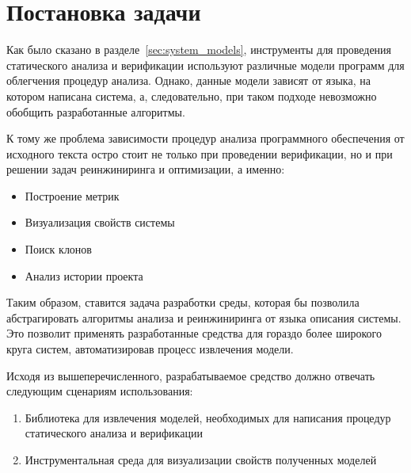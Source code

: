 \chapter{Постановка задачи}
Как было сказано в разделе~\ref{sec:system_models}, инструменты для проведения
статического анализа и верификации используют различные модели программ для
облегчения процедур анализа. Однако, данные модели зависят от языка, на котором
написана система, а, следовательно, при таком подходе невозможно обобщить
разработанные алгоритмы.

К тому же проблема зависимости процедур анализа программного обеспечения от
исходного текста остро стоит не только при проведении верификации, но и при
решении задач реинжиниринга и оптимизации, а именно:

\begin{itemize}
    \item Построение метрик
    \item Визуализация свойств системы
    \item Поиск клонов
    \item Анализ истории проекта
\end{itemize}

Таким образом, ставится задача разработки среды, которая бы позволила
абстрагировать алгоритмы анализа и реинжиниринга от языка описания системы. Это
позволит применять разработанные средства для гораздо более широкого круга
систем, автоматизировав процесс извлечения модели.

Исходя из вышеперечисленного, разрабатываемое средство должно отвечать
следующим сценариям использования:

\begin{enumerate}
    \item Библиотека для извлечения моделей, необходимых для написания процедур
    статического анализа и верификации
    \item Инструментальная среда для визуализации свойств полученных моделей
\end{enumerate}

\subsection{}
